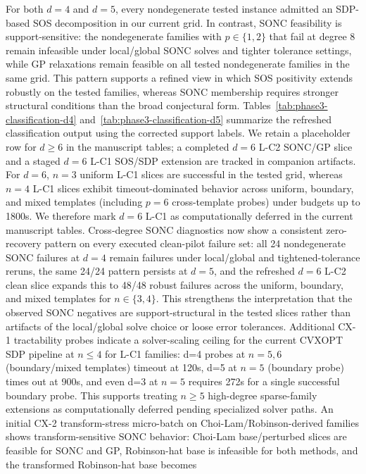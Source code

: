 \documentclass{article}
\begin{document}
For both $d=4$ and $d=5$, every nondegenerate tested instance admitted an SDP-based SOS
decomposition in our current grid. In contrast, SONC feasibility is support-sensitive: the
nondegenerate families with $p \in \{1,2\}$ that fail at degree $8$ remain infeasible under
local/global SONC solves and tighter tolerance settings, while GP relaxations remain feasible on
all tested nondegenerate families in the same grid. This pattern supports a refined view in which
SOS positivity extends robustly on the tested families, whereas SONC membership requires stronger
structural conditions than the broad conjectural form. Tables~\ref{tab:phase3-classification-d4}
and~\ref{tab:phase3-classification-d5} summarize the refreshed classification output using the
corrected support labels. We retain a placeholder row for $d \geq 6$ in the manuscript tables;
a completed $d=6$ L-C2 SONC/GP slice and a staged $d=6$ L-C1 SOS/SDP extension are tracked
in companion artifacts. For $d=6$, $n=3$ uniform L-C1 slices are successful in the tested grid,
whereas $n=4$ L-C1 slices exhibit timeout-dominated behavior across uniform, boundary, and mixed
templates (including $p=6$ cross-template probes) under budgets up to 1800s. We therefore mark
$d=6$ L-C1 as computationally deferred in the current manuscript tables.
Cross-degree SONC diagnostics now show a consistent zero-recovery pattern on every executed
clean-pilot failure set: all 24 nondegenerate SONC failures at $d=4$ remain failures under
local/global and tightened-tolerance reruns, the same 24/24 pattern persists at $d=5$, and the
refreshed $d=6$ L-C2 clean slice expands this to 48/48 robust failures across the uniform,
boundary, and mixed templates for $n\in\{3,4\}$. This strengthens the interpretation that the
observed SONC negatives are support-structural in the tested slices rather than artifacts of the
local/global solve choice or loose error tolerances.
Additional CX-1 tractability probes indicate a solver-scaling ceiling for the current CVXOPT SDP
pipeline at $n \leq 4$ for L-C1 families: d=4 probes at $n=5,6$ (boundary/mixed templates) timeout
at 120s, d=5 at $n=5$ (boundary probe) times out at 900s, and even d=3 at $n=5$ requires 272s for
a single successful boundary probe. This supports treating $n \geq 5$ high-degree sparse-family
extensions as computationally deferred pending specialized solver paths.
An initial CX-2 transform-stress micro-batch on Choi-Lam/Robinson-derived families shows
transform-sensitive SONC behavior: Choi-Lam base/perturbed slices are feasible for SONC and GP,
Robinson-hat base is infeasible for both methods, and the transformed Robinson-hat base becomes
\end{document}
